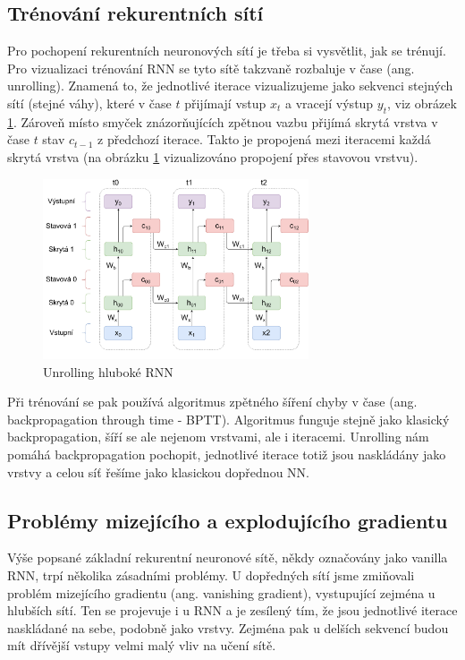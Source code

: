 \subsection{Trénování rekurentních sítí}

Pro pochopení rekurentních neuronových sítí je třeba si vysvětlit, jak se
trénují. Pro vizualizaci trénování RNN se tyto sítě takzvaně rozbaluje v čase
(ang. unrolling). Znamená to, že jednotlivé iterace vizualizujeme jako sekvenci
stejných sítí (stejné váhy), které v čase $t$ přijímají vstup $x_t$ a vracejí
výstup $y_t$, viz obrázek \ref{fig:bptt}. Zároveň místo smyček znázorňujících
zpětnou vazbu přijímá skrytá vrstva v čase $t$ stav $c_{t-1}$ z předchozí
iterace. Takto je propojená mezi iteracemi každá skrytá vrstva (na obrázku
\ref{fig:bptt} vizualizováno propojení přes stavovou vrstvu).

\begin{figure}[]
    \centering
    \includegraphics[width=0.7\textwidth]{Figures/BPTT.pdf}
    \caption{Unrolling hluboké RNN}
    \label{fig:bptt}
\end{figure}

Při trénování se pak používá algoritmus zpětného šíření chyby v čase (ang.
backpropagation through time - BPTT). Algoritmus funguje stejně jako klasický
backpropagation, šíří se ale nejenom vrstvami, ale i iteracemi. Unrolling nám
pomáhá backpropagation pochopit, jednotlivé iterace totiž jsou naskládány jako
vrstvy a celou síť řešíme jako klasickou dopřednou NN.

\subsection{Problémy mizejícího a explodujícího gradientu}

Výše popsané základní rekurentní neuronové sítě, někdy označovány jako vanilla
RNN, trpí několika zásadními problémy. U dopředných sítí jsme zmiňovali problém
mizejícího gradientu (ang. vanishing gradient), vystupující zejména u hlubších
sítí. Ten se projevuje i u RNN a je zesílený tím, že jsou jednotlivé iterace
naskládané na sebe, podobně jako vrstvy. Zejména pak u delších sekvencí budou
mít dřívější vstupy velmi malý vliv na učení sítě.


